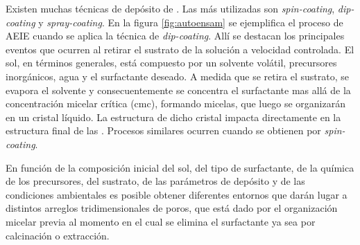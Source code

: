 	 Existen muchas técnicas de depósito de \pdm. Las más utilizadas son \textit{spin-coating}, \textit{dip-coating} y \textit{spray-coating}. En la figura \ref{fig:autoensam} se ejemplifica el proceso de AEIE cuando se aplica la técnica de \textit{dip-coating}. Allí se destacan los principales eventos que ocurren al retirar el sustrato de la solución a velocidad controlada. El sol, en términos generales, está compuesto por un solvente volátil, precursores inorgánicos, agua y el surfactante deseado. A medida que se retira el sustrato, se evapora el solvente y consecuentemente se concentra el surfactante mas allá de la concentración micelar crítica (cmc), formando micelas, que luego se organizarán en un cristal líquido. La estructura de dicho cristal impacta directamente en la estructura final de las \pdm. Procesos similares ocurren cuando se obtienen \pdm\space por \textit{spin-coating}. 
 				
   	 En función de la composición inicial del sol, del tipo de surfactante, de la química de los precursores, del sustrato, de las parámetros de depósito y de las condiciones ambientales es posible obtener diferentes entornos que darán lugar a distintos arreglos tridimensionales de poros, que está dado por el organización micelar previa al momento en el cual se elimina el surfactante ya sea por calcinación o extracción.\cite{Grosso2004,Grosso2002,Crepaldi2002a,Grosso2003,Violi2015} 
		

